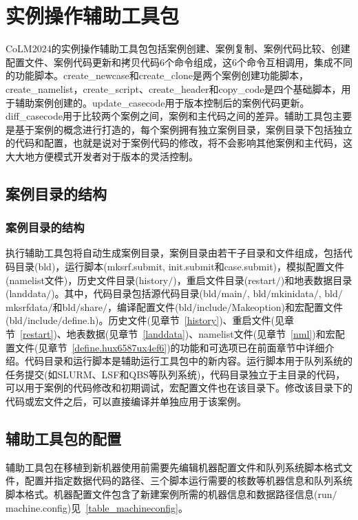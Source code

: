 \documentclass[a4paper,12pt,twoside]{article}
\begin{document}
\section{实例操作辅助工具包}
CoLM2024的实例操作辅助工具包包括案例创建、案例复制、案例代码比较、创建配置文件、案例代码更新和拷贝代码6个命令组成，这6个命令互相调用，集成不同的功能脚本。create\_newcase和create\_clone是两个案例创建功能脚本，create\_namelist，create\_script、create\_header和copy\_code是四个基础脚本，用于辅助案例创建的。update\_casecode用于版本控制后的案例代码更新。diff\_casecode用于比较两个案例之间，案例和主代码之间的差异。辅助工具包主要是基于案例的概念进行打造的，每个案例拥有独立案例目录，案例目录下包括独立的代码和配置，也就是说对于案例代码的修改，将不会影响其他案例和主代码，这大大地方便模式开发者对于版本的灵活控制。

\subsection{案例目录的结构}
\subsubsection{案例目录的结构}
执行辅助工具包将自动生成案例目录，案例目录由若干子目录和文件组成，包括代码目录(bld)，运行脚本(mksrf.submit, init.submit和case.submit)，模拟配置文件(namelist文件)，历史文件目录(history$\slash$)，重启文件目录(restart$\slash$)和地表数据目录(landdata$\slash$)。其中，代码目录包括源代码目录(bld$\slash$main$\slash$, bld$\slash$mkinidata$\slash$, bld$\slash$mksrfdata$\slash$和bld$\slash$share$\slash$，编译配置文件(bld$\slash$include$\slash$Makeoption)和宏配置文件(bld$\slash$include$\slash$define.h)。历史文件(见章节~\ref{history})、重启文件(见章节~\ref{restart})、地表数据(见章节~\ref{landdata})、namelist文件(见章节~\ref{nml})和宏配置文件(见章节~\ref{define.hux6587ux4ef6})的功能和可选项已在前面章节中详细介绍。代码目录和运行脚本是辅助运行工具包中的新内容。运行脚本用于队列系统的任务提交(如SLURM、LSF和QBS等队列系统)，代码目录独立于主目录的代码，可以用于案例的代码修改和初期调试，宏配置文件也在该目录下。修改该目录下的代码或宏文件之后，可以直接编译并单独应用于该案例。

\subsection{辅助工具包的配置}

辅助工具包在移植到新机器使用前需要先编辑机器配置文件和队列系统脚本格式文件，配置并指定数据代码的路径、三个脚本运行需要的核数等机器信息和队列系统脚本格式。机器配置文件包含了新建案例所需的机器信息和数据路径信息(run$\slash$machine.config)见~\ref{table_machineconfig}。
\end{document}

